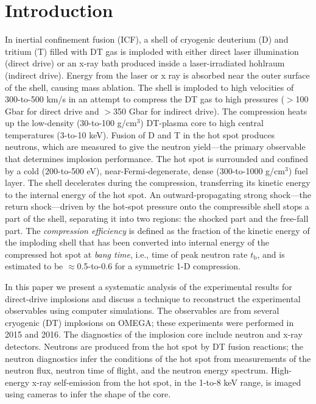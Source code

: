 \documentclass[aip,reprint]{revtex4-1}
\begin{document}
\section{Introduction}
\label{sec:intro}
%
 In inertial confinement fusion (ICF),\cite{nuckolls_laser_1972, betti_inertial-confinement_2016} a shell of cryogenic deuterium (D) and tritium (T) filled with DT gas is imploded with either direct laser illumination (direct drive)\cite{bodner_direct-drive_1998} or an x-ray bath produced inside a laser-irradiated hohlraum (indirect drive).\cite{lindl_development_1995} Energy from the laser or x ray is absorbed near the outer surface of the shell, causing mass ablation. The shell is imploded to high velocities of 300-to-500 km/s in an attempt to compress the DT gas to high pressures ($>$100 Gbar for direct drive and $>$350 Gbar for indirect drive). The compression heats up the low-density (30-to-100 g/cm$^3$) DT-plasma core to high central temperatures (3-to-10 keV). Fusion of D and T in the hot spot produces neutrons, which are measured to give the neutron yield---the primary observable that determines implosion performance. The hot spot is surrounded and confined by a cold (200-to-500 eV), near-Fermi-degenerate, dense (300-to-1000 g/cm$^3$) fuel layer. The shell decelerates during the compression, transferring its kinetic energy to the internal energy of the hot spot. An outward-propagating strong shock---the return shock---driven by the hot-spot pressure onto the compressible shell stops a part of the shell, separating it into two regions: the shocked part and the free-fall part.\cite{betti_deceleration_2002} The \textit{compression efficiency} is defined as the fraction of the kinetic energy of the imploding shell that has been converted into internal energy of the compressed hot spot at \textit{bang time}, i.e., time of peak neutron rate $t_\text{b}$, and is estimated to be $\approx$0.5-to-0.6 for a symmetric 1-D compression. 


%
%
In this paper we present a systematic analysis of the experimental results for direct-drive implosions and discuss a technique to reconstruct the experimental observables using computer simulations. The observables are from several cryogenic (DT) implosions on OMEGA; these experiments were performed in 2015 and 2016.\cite{Exp_Regan} The diagnostics of the implosion core include neutron and x-ray detectors. Neutrons are produced from the hot spot by DT fusion reactions; the neutron diagnostics infer the conditions of the hot spot from measurements of the neutron flux, neutron time of flight, and the neutron energy spectrum. High-energy x-ray self-emission from the hot spot, in the 1-to-8 keV range, is imaged using cameras to infer the shape of the core. 
\end{document}
